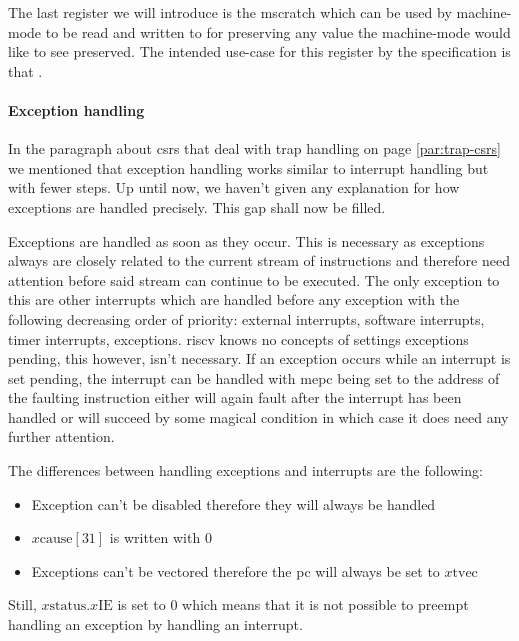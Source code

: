The last register we will introduce is the \gls{mscratch} which can be used by machine-mode to be read and written to for preserving any value the machine-mode would like to see preserved.
The intended use-case for this register by the specification is that .

\paragraph{Exception handling}
In the paragraph about \glspl{csr} that deal with trap handling on page \ref{par:trap-csrs} we mentioned that exception handling works similar to interrupt handling but with fewer steps.
Up until now, we haven't given any explanation for how exceptions are handled precisely.
This gap shall now be filled.

Exceptions are handled as soon as they occur.
This is necessary as exceptions always are closely related to the current stream of instructions and therefore need attention before said stream can continue to be executed.
The only exception to this are other interrupts which are handled before any exception with the following decreasing order of priority: external interrupts, software interrupts, timer interrupts, exceptions.
\gls{riscv} knows no concepts of settings exceptions pending, this however, isn't necessary.
If an exception occurs while an interrupt is set pending, the interrupt can be handled with \gls{mepc} being set to the address of the faulting instruction either will again fault after the interrupt has been handled or will succeed by some magical condition in which case it does need any further attention.

The differences between handling exceptions and interrupts are the following:
\begin{itemize}
    \item Exception can't be disabled therefore they will always be handled
    \item $ x\text{cause}[31] $ is written with $ 0 $
    \item Exceptions can't be vectored therefore the \gls{pc} will always be set to $ x\text{tvec} $
\end{itemize}

Still, $ x\text{status}.x\text{IE} $ is set to 0 which means that it is not possible to preempt handling an exception by handling an interrupt.

